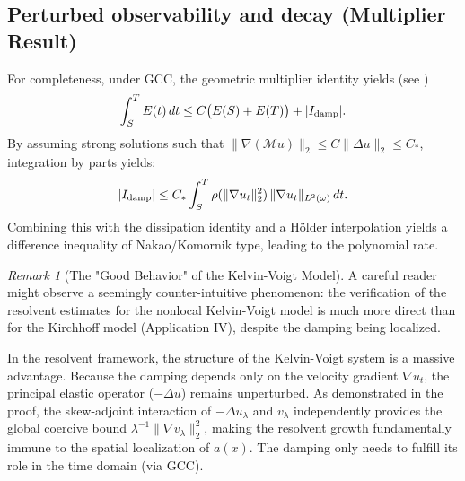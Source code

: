 \documentclass[11pt,reqno]{amsart}
\theoremstyle{remark}
\newtheorem{remark}[theorem]{Remark}
\begin{document}
\subsection{Perturbed observability and decay (Multiplier Result)}

For completeness, under GCC, the geometric multiplier identity yields (see \cite{Cavalcanti2025})
\begin{equation}\label{eq:obs_KV_skeleton}
\int_S^T E(t)\,dt \le C\bigl(E(S)+E(T)\bigr) + |I_{\rm damp}|.
\end{equation}
By assuming strong solutions such that $\|\nabla(\mathcal M u)\|_2 \le C\|\Delta u\|_2 \le C_*$, integration by parts yields:
\begin{equation}\label{eq:I_damp_est}
|I_{\rm damp}| \le C_*\int_S^T \rho(\|\nabla u_t\|_2^2)\,\|\nabla u_t\|_{L^2(\omega)}\,dt.
\end{equation}
Combining this with the dissipation identity and a Hölder interpolation yields a difference inequality of Nakao/Komornik type, leading to the polynomial rate.

\begin{remark}[The "Good Behavior" of the Kelvin-Voigt Model]
\label{rem:kelvin_voigt_paradox}
A careful reader might observe a seemingly counter-intuitive phenomenon: the verification of the resolvent estimates for the nonlocal Kelvin-Voigt model is much more direct than for the Kirchhoff model (Application IV), despite the damping being localized.

In the resolvent framework, the structure of the Kelvin-Voigt system is a massive advantage. Because the damping depends only on the velocity gradient $\nabla u_t$, the principal elastic operator ($-\Delta u$) remains unperturbed. As demonstrated in the proof, the skew-adjoint interaction of $-\Delta u_\lambda$ and $v_\lambda$ independently provides the global coercive bound $\lambda^{-1}\|\nabla v_\lambda\|_2^2$, making the resolvent growth fundamentally immune to the spatial localization of $a(x)$. The damping only needs to fulfill its role in the time domain (via GCC).
\end{remark}
\end{document}
